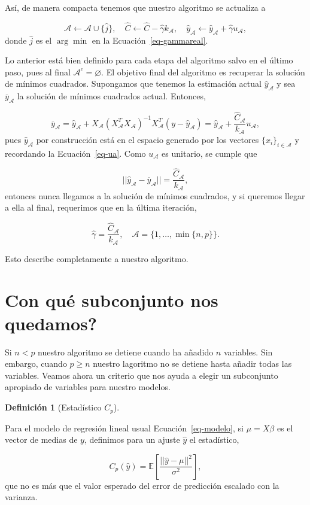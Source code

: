 \documentclass[
  letterpaper,
  DIV=11,
  numbers=noendperiod]{scrreprt}
\theoremstyle{plain}
\theoremstyle{definition}
\newtheorem{definition}{Definición}[chapter]
\theoremstyle{remark}
\begin{document}
Así, de manera compacta tenemos que nuestro algoritmo se actualiza a

\[
\mathcal A\longleftarrow \mathcal A\cup\{\hat j\},\quad \hat C\longleftarrow  \hat C-\hat\gamma k_{\mathcal A},\quad \hat y_{\mathcal A}\longleftarrow \hat y_\mathcal A+\hat\gamma u_\mathcal A,
\]donde \(\hat j\) es el \(\arg\min\) en la Ecuación~\ref{eq-gammareal}.

Lo anterior está bien definido para cada etapa del algoritmo salvo en el
último paso, pues al final \(\mathcal A^c=\varnothing\). El objetivo
final del algoritmo es recuperar la solución de mínimos cuadrados.
Supongamos que tenemos la estimación actual \(\hat y_\mathcal A\) y sea
\(\overline y_\mathcal A\) la solución de mínimos cuadrados actual.
Entonces,

\[
\overline y_\mathcal A=\hat y_\mathcal A+X_\mathcal A(X_\mathcal A^TX_\mathcal A)^{-1}X_\mathcal A^T(y-\hat y_\mathcal A)=\hat y_\mathcal A+\frac{\hat C_\mathcal A}{k_\mathcal A}u_\mathcal A,
\]pues \(\hat y_\mathcal A\) por construcción está en el espacio
generado por los vectores \(\{x_i\}_{i\in \mathcal A}\) y recordando la
Ecuación~\ref{eq-ua}. Como \(u_\mathcal A\) es unitario, se cumple que

\[
||\hat y_\mathcal A-\overline y_\mathcal A||=\frac{\hat C_\mathcal A}{k_\mathcal A},
\]entonces nunca llegamos a la solución de mínimos cuadrados, y si
queremos llegar a ella al final, requerimos que en la última iteración,

\[
\hat\gamma=\frac{\hat C_\mathcal A}{k_\mathcal A},\quad \mathcal A=\{1,\dots, \min\{n,p\}\}.
\]

Esto describe completamente a nuestro algoritmo.

\section{Con qué subconjunto nos
quedamos?}\label{con-quuxe9-subconjunto-nos-quedamos}

Si \(n<p\) nuestro algoritmo se detiene cuando ha añadido \(n\)
variables. Sin embargo, cuando \(p\geq n\) nuestro lagoritmo no se
detiene hasta añadir todas las variables. Veamos ahora un criterio que
nos ayuda a elegir un subconjunto apropiado de variables para nuestro
modelos.

\begin{definition}[Estadístico
\(C_p\)]\protect\hypertarget{def-Cp}{}\label{def-Cp}

Para el modelo de regresión lineal usual Ecuación~\ref{eq-modelo}, si
\(\mu=X\beta\) es el vector de medias de \(y\), definimos para un ajuste
\(\hat y\) el estadístico,

\[
C_p(\hat y)=\mathbb E\left[\frac{||\hat y-\mu||^2}{\sigma^2}\right],
\]que no es más que el valor esperado del error de predicción escalado
con la varianza.

\end{definition}
\end{document}
